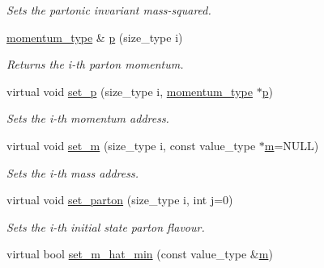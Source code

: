 \begin{DoxyCompactItemize}
\begin{DoxyCompactList}\small\item\em Sets the partonic invariant mass-\/squared. \end{DoxyCompactList}\item 
\hypertarget{a00304_a0ca7624c4465f3faca039b45d9705f22}{\hyperlink{a00559}{momentum\-\_\-type} \& \hyperlink{a00304_a0ca7624c4465f3faca039b45d9705f22}{p} (size\-\_\-type i)}\label{a00304_a0ca7624c4465f3faca039b45d9705f22}

\begin{DoxyCompactList}\small\item\em Returns the i-\/th parton momentum. \end{DoxyCompactList}\item 
\hypertarget{a00304_a427f63b82bb183b500a4f04243d9293e}{virtual void \hyperlink{a00304_a427f63b82bb183b500a4f04243d9293e}{set\-\_\-p} (size\-\_\-type i, \hyperlink{a00559}{momentum\-\_\-type} $\ast$\hyperlink{a00304_a0ca7624c4465f3faca039b45d9705f22}{p})}\label{a00304_a427f63b82bb183b500a4f04243d9293e}

\begin{DoxyCompactList}\small\item\em Sets the i-\/th momentum address. \end{DoxyCompactList}\item 
\hypertarget{a00304_aa7b36a6f9e3a0f18d8e8b8d55f5ebf1f}{virtual void \hyperlink{a00304_aa7b36a6f9e3a0f18d8e8b8d55f5ebf1f}{set\-\_\-m} (size\-\_\-type i, const value\-\_\-type $\ast$\hyperlink{a00304_a2a95cea4e7fd1e59bf96fed7225afdf2}{m}=N\-U\-L\-L)}\label{a00304_aa7b36a6f9e3a0f18d8e8b8d55f5ebf1f}

\begin{DoxyCompactList}\small\item\em Sets the i-\/th mass address. \end{DoxyCompactList}\item 
\hypertarget{a00304_a87937949a015172c8a447e09b3b66f99}{virtual void \hyperlink{a00304_a87937949a015172c8a447e09b3b66f99}{set\-\_\-parton} (size\-\_\-type i, int j=0)}\label{a00304_a87937949a015172c8a447e09b3b66f99}

\begin{DoxyCompactList}\small\item\em Sets the i-\/th initial state parton flavour. \end{DoxyCompactList}\item 
\hypertarget{a00304_a92767ab9fff688b4c92a21fb9d49f7cd}{virtual bool \hyperlink{a00304_a92767ab9fff688b4c92a21fb9d49f7cd}{set\-\_\-m\-\_\-hat\-\_\-min} (const value\-\_\-type \&\hyperlink{a00304_a2a95cea4e7fd1e59bf96fed7225afdf2}{m})}\label{a00304_a92767ab9fff688b4c92a21fb9d49f7cd}


\end{DoxyCompactItemize}
